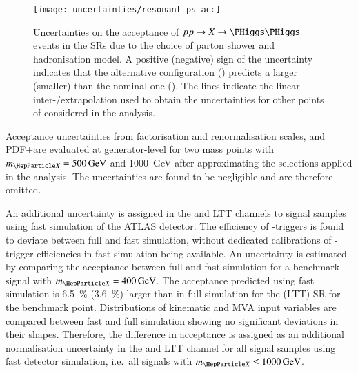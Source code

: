 
\begin{figure}[htbp]
  \centering

  \texttt{[image: uncertainties/resonant\_ps\_acc]}

  \caption[Uncertainties on the acceptance of $pp \to X \to \HH$ events in the
  SRs due to the choice of parton shower and hadronisation model.]{Uncertainties
    on the acceptance of $pp \to X \to \HH$ events in the SRs due to the choice
    of parton shower and hadronisation model. A positive (negative) sign of the
    uncertainty indicates that the alternative configuration (\PYTHIA) predicts
    a larger (smaller) \AccTimesEff than the nominal one (\HERWIG). The lines
    indicate the linear inter-/extrapolation used to obtain the uncertainties
    for other points of \mX considered in the analysis.}%
  \label{fig:resonant_partonshower}
\end{figure}

Acceptance uncertainties from factorisation and renormalisation scales, and
PDF+\alphas are evaluated at generator-level for two mass points with
$\mX = \SI{500}{\GeV}$ and \SI{1000}{\GeV} after approximating the selections
applied in the analysis. The uncertainties are found to be negligible and are
therefore omitted.

An additional uncertainty is assigned in the \hadhad and \lephad LTT channels to
signal samples using fast simulation of the ATLAS detector. The efficiency of
\tauhadvis-triggers is found to deviate between full and fast simulation,
without dedicated calibrations of \tauhadvis-trigger efficiencies in fast
simulation being available. An uncertainty is estimated by comparing the
acceptance between full and fast simulation for a benchmark signal with
$\mX = \SI{400}{\GeV}$. The acceptance predicted using fast simulation is
\SI{6.5}{\percent} (\SI{3.6}{\percent}) larger than in full simulation for the
\hadhad (\lephad LTT) SR for the benchmark point. Distributions of kinematic and
MVA input variables are compared between fast and full simulation showing no
significant deviations in their shapes. Therefore, the difference in acceptance
is assigned as an additional normalisation uncertainty in the \hadhad and
\lephad LTT channel for all signal samples using fast detector simulation, i.e.\
all signals with $\mX \leq \SI{1000}{\GeV}$.


